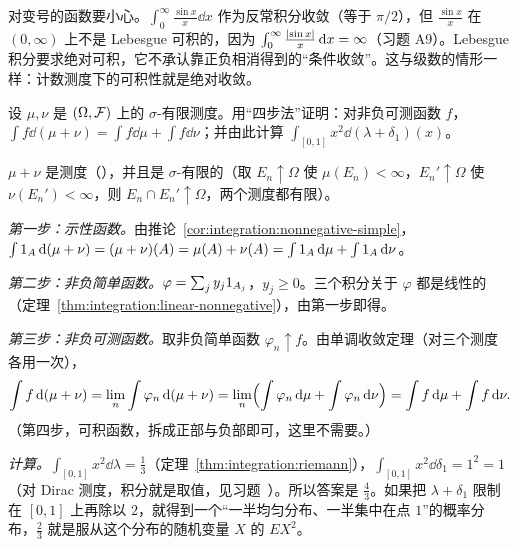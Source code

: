 对变号的函数要小心。$\int_0^\infty\frac{\sin x}x\dd x$ 作为反常积分收敛（等于 $\pi/2$），但 $\frac{\sin x}x$ 在 $(0,\infty)$ 上不是 Lebesgue 可积的，因为 $\int_0^\infty\frac{\lvert \sin x\rvert}x\,\mathrm{d} x=\infty$（习题 A9）。Lebesgue 积分要求绝对可积，它不承认靠正负相消得到的“条件收敛”。这与级数的情形一样：计数测度下的可积性就是绝对收敛。

\begin{workedexample}\label{we:integration:four-step}
设 $\mu,\nu$ 是 $(\Omega,\mathcal{F})$ 上的 $\sigma$-有限测度。用“四步法”证明：对非负可测函数 $f$，$\int f\dd(\mu+\nu)=\int f\dd\mu+\int f\dd\nu$；并由此计算 $\int_{[0,1]}x^2\dd(\lambda+\delta_1)(x)$。
\end{workedexample}
\begin{solution}
$\mu+\nu$ 是测度（），并且是 $\sigma$-有限的（取 $E_n\uparrow\Omega$ 使 $\mu(E_n)<\infty$，$E_n'\uparrow\Omega$ 使 $\nu(E_n')<\infty$，则 $E_n\cap E_n'\uparrow\Omega$，两个测度都有限）。

\emph{第一步：示性函数。}由推论~\ref{cor:integration:nonnegative-simple}，$\int1_A\,\mathrm{d}(\mu+\nu)=(\mu+\nu)(A)=\mu(A)+\nu(A)=\int1_A\,\mathrm{d}\mu+\int1_A\,\mathrm{d}\nu$。

\emph{第二步：非负简单函数。}$\varphi=\sum_jy_j1_{A_j}$，$y_j\geqslant0$。三个积分关于 $\varphi$ 都是线性的（定理~\ref{thm:integration:linear-nonnegative}），由第一步即得。

\emph{第三步：非负可测函数。}取非负简单函数 $\varphi_n\uparrow f$。由单调收敛定理（对三个测度各用一次），
\[
\int f\,\mathrm{d}(\mu+\nu)=\lim_n\int\varphi_n\,\mathrm{d}(\mu+\nu)=\lim_n\Bigl(\int\varphi_n\,\mathrm{d}\mu+\int\varphi_n\,\mathrm{d}\nu\Bigr)=\int f\,\mathrm{d}\mu+\int f\,\mathrm{d}\nu .
\]
（第四步，可积函数，拆成正部与负部即可，这里不需要。）

\emph{计算。}$\int_{[0,1]}x^2\dd\lambda=\frac13$（定理~\ref{thm:integration:riemann}），$\int_{[0,1]}x^2\dd\delta_1=1^2=1$（对 Dirac 测度，积分就是取值，见习题~）。所以答案是 $\frac43$。如果把 $\lambda+\delta_1$ 限制在 $[0,1]$ 上再除以 $2$，就得到一个“一半均匀分布、一半集中在点 $1$”的概率分布，$\frac23$ 就是服从这个分布的随机变量 $X$ 的 $EX^2$。
\end{solution}

